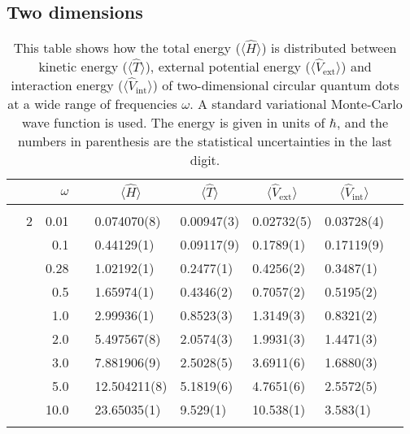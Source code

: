 \subsection{Two dimensions}
\begin{table}[H]
	\caption{This table shows how the total energy ($\langle\hat{H}\rangle$) is distributed between kinetic energy ($\langle\hat{T}\rangle$), external potential energy ($\langle\hat{V}_{\text{ext}}\rangle$) and interaction energy ($\langle\hat{V}_{\text{int}}\rangle$) of two-dimensional circular quantum dots at a wide range of frequencies $\omega$. A standard variational Monte-Carlo wave function is used. The energy is given in units of $\hbar$, and the numbers in parenthesis are the statistical uncertainties in the last digit.}
	\label{tab:splitfrequencyQDVMC}
	\begin{tabularx}{\textwidth}{R{1cm}rrcR{2.3cm}R{2.3cm}R{2.3cm}R{2.3cm}R{1cm}} \hline\hline
		&\makecell{\\ \phantom{$N$} \\ \phantom{=}} & $\omega$ &&  &  &  &  & \\ \hline \\
		&2 & 0.01 && 0.074070(8) & 0.00947(3) & 0.02732(5) & 0.03728(4) \\
		&& 0.1 && 0.44129(1) & 0.09117(9) & 0.1789(1) & 0.17119(9) \\
		&& 0.28 && 1.02192(1) & 0.2477(1) & 0.4256(2) & 0.3487(1) \\
		&& 0.5 && 1.65974(1) & 0.4346(2) & 0.7057(2) & 0.5195(2)\\
		&& 1.0 && 2.99936(1) & 0.8523(3) & 1.3149(3) & 0.8321(2)\\
		&& 2.0 && 5.497567(8) & 2.0574(3) & 1.9931(3) & 1.4471(3) \\
		&& 3.0 && 7.881906(9) & 2.5028(5) & 3.6911(6) & 1.6880(3) \\ 
		&& 5.0 && 12.504211(8) & 5.1819(6) & 4.7651(6) & 2.5572(5) \\
		&& 10.0 && 23.65035(1) & 9.529(1) & 10.538(1) & 3.583(1) \\
		\hdashline \\
		

\end{tabularx}
\end{table}
